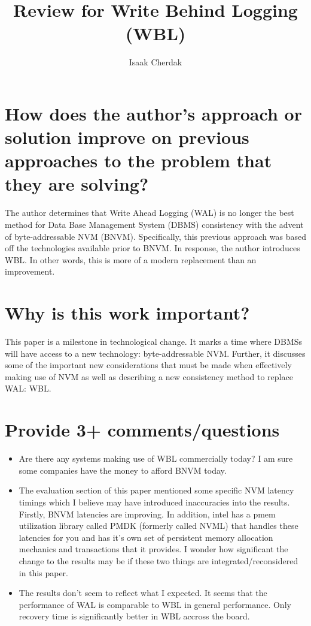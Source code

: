 \documentclass{article}
\title{Review for Write Behind Logging (WBL)}
\author{Isaak Cherdak}
\begin{document}
\maketitle

\section{How does the author's approach or solution improve on previous
approaches to the problem that they are solving?}

The author determines that Write Ahead Logging (WAL) is no longer the best
method for Data Base Management System (DBMS) consistency with the advent of
byte-addressable NVM (BNVM). Specifically, this previous approach was based off
the technologies available prior to BNVM. In response, the author introduces
WBL. In other words, this is more of a modern replacement than an improvement.

\section{Why is this work important?}

This paper is a milestone in technological change. It marks a time where DBMSs
will have access to a new technology: byte-addressable NVM. Further, it
discusses some of the important new considerations that must be made when
effectively making use of NVM as well as describing a new consistency method to
replace WAL: WBL.

\section{Provide 3+ comments/questions}

\begin{itemize}
  \item Are there any systems making use of WBL commercially today? I am sure
    some companies have the money to afford BNVM today.
  \item The evaluation section of this paper mentioned some specific NVM latency
    timings which I believe may have introduced inaccuracies into the results.
    Firstly, BNVM latencies are improving. In addition, intel has a pmem
    utilization library called PMDK (formerly called NVML) that handles these
    latencies for you and has it's own set of persistent memory allocation
    mechanics and transactions that it provides. I wonder how significant the
    change to the results may be if these two things are integrated/reconsidered
    in this paper.
  \item The results don't seem to reflect what I expected. It seems that the
    performance of WAL is comparable to WBL in general performance. Only
    recovery time is significantly better in WBL accross the board.
\end{itemize}
\end{document}
